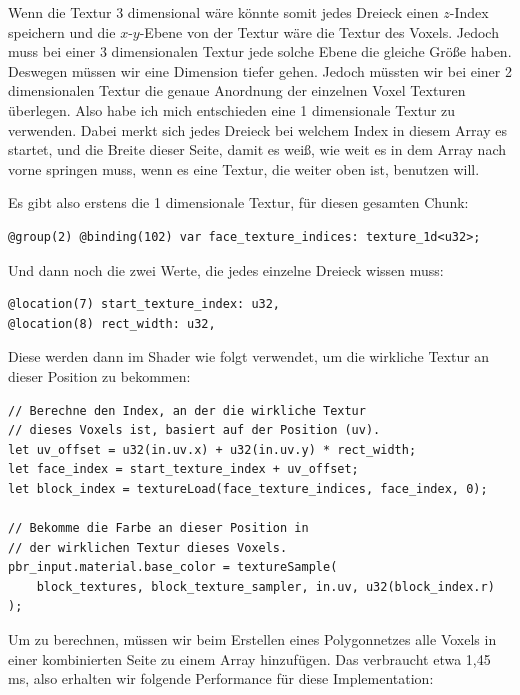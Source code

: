 Wenn die Textur 3 dimensional wäre könnte somit
jedes Dreieck einen $z$-Index speichern und die
$x$-$y$-Ebene von der Textur wäre die Textur des Voxels.
Jedoch muss bei einer 3 dimensionalen Textur jede
solche Ebene die gleiche Größe haben.
Deswegen müssen wir eine Dimension tiefer gehen.
Jedoch müssten wir bei einer 2 dimensionalen Textur
die genaue Anordnung der einzelnen Voxel Texturen
überlegen.
Also habe ich mich entschieden eine 1 dimensionale
Textur zu verwenden.
Dabei merkt sich jedes Dreieck bei welchem Index
in diesem Array es startet, und die Breite dieser
Seite, damit es weiß, wie weit es in dem Array nach
vorne springen muss, wenn es eine Textur, die weiter
oben ist, benutzen will.
 
Es gibt also erstens die 1 dimensionale Textur,
für diesen gesamten Chunk:

\begin{lstlisting}[language=WGSL]
@group(2) @binding(102) var face_texture_indices: texture_1d<u32>;
\end{lstlisting}

Und dann noch die zwei Werte, die jedes einzelne
Dreieck wissen muss:

\begin{lstlisting}[language=WGSL]
@location(7) start_texture_index: u32,
@location(8) rect_width: u32,
\end{lstlisting}

Diese werden dann im  Shader wie
folgt verwendet, um die wirkliche Textur an
dieser Position zu bekommen:

\begin{lstlisting}[language=WGSL]
// Berechne den Index, an der die wirkliche Textur
// dieses Voxels ist, basiert auf der Position (uv).
let uv_offset = u32(in.uv.x) + u32(in.uv.y) * rect_width;
let face_index = start_texture_index + uv_offset;
let block_index = textureLoad(face_texture_indices, face_index, 0);

// Bekomme die Farbe an dieser Position in
// der wirklichen Textur dieses Voxels.
pbr_input.material.base_color = textureSample(
	block_textures, block_texture_sampler, in.uv, u32(block_index.r)
);
\end{lstlisting}

\pagebreak

Um  zu berechnen,
müssen wir beim Erstellen eines Polygonnetzes
alle Voxels in einer kombinierten Seite
zu einem Array hinzufügen.
Das verbraucht etwa 1,45 ms,
also erhalten wir folgende Performance für
diese Implementation:

